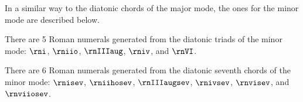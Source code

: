 
In a similar way to the diatonic chords of the major mode,
the ones for the minor mode are described below.


There are 5 Roman numerals generated from the diatonic
triads of the minor mode: $\rni$, $\rniio$, $\rnIIIaug$,
$\rniv$, and $\rnVI$.



There are 6 Roman numerals generated from the diatonic
seventh chords of the minor mode: $\rnisev$, $\rniihosev$,
$\rnIIIaugsev$, $\rnivsev$, $\rnvisev$, and $\rnviiosev$.
